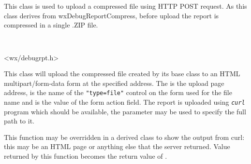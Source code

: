 
\section{}\label{wxdebugreportupload}

This class is used to upload a compressed file using HTTP POST request. As this
class derives from wxDebugReportCompress, before upload the report is
compressed in a single .ZIP file.


\\


<wx/debugrpt.h>





\label{wxdebugreportuploadwxdebugreportupload}


This class will upload the compressed file created by its base class to an HTML
multipart/form-data form at the specified address. The  is the upload
page address,  is the name of the \texttt{"type=file"} control on
the form used for the file name and  is the value of the form
action field. The report is uploaded using \texttt{\textit{curl}} program which
should be available, the  parameter may be used to specify the full
path to it.


\label{wxdebugreportuploadonserverreply}


This function may be overridden in a derived class to show the output from
curl: this may be an HTML page or anything else that the server returned.
Value returned by this function becomes the return value of 
.


